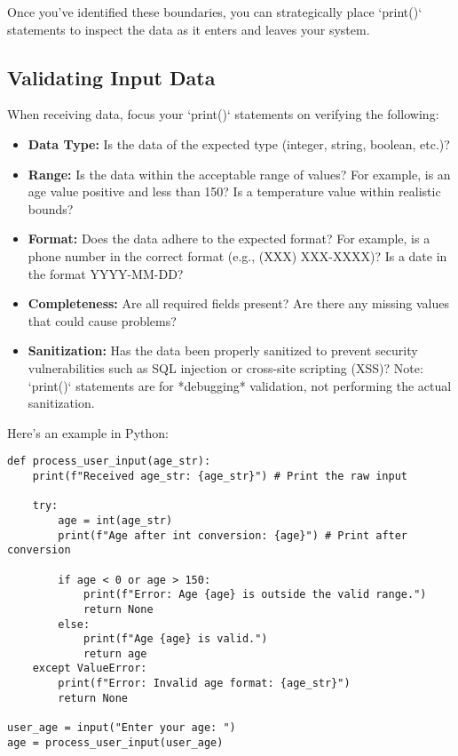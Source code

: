 \documentclass{article}
\begin{document}
{{{Once you've identified these boundaries, you can strategically place `print()` statements to inspect the data as it enters and leaves your system.

\subsection*{Validating Input Data}

When receiving data, focus your `print()` statements on verifying the following:

\begin{itemize}
    \itemsep0em
    \item \textbf{Data Type:} Is the data of the expected type (integer, string, boolean, etc.)?
    \item \textbf{Range:} Is the data within the acceptable range of values? For example, is an age value positive and less than 150? Is a temperature value within realistic bounds?
    \item \textbf{Format:} Does the data adhere to the expected format? For example, is a phone number in the correct format (e.g., (XXX) XXX-XXXX)? Is a date in the format YYYY-MM-DD?
    \item \textbf{Completeness:} Are all required fields present? Are there any missing values that could cause problems?
    \item \textbf{Sanitization:} Has the data been properly sanitized to prevent security vulnerabilities such as SQL injection or cross-site scripting (XSS)? Note: `print()` statements are for *debugging* validation, not performing the actual sanitization.
\end{itemize}

Here's an example in Python:

\begin{verbatim}
def process_user_input(age_str):
    print(f"Received age_str: {age_str}") # Print the raw input

    try:
        age = int(age_str)
        print(f"Age after int conversion: {age}") # Print after conversion

        if age < 0 or age > 150:
            print(f"Error: Age {age} is outside the valid range.")
            return None
        else:
            print(f"Age {age} is valid.")
            return age
    except ValueError:
        print(f"Error: Invalid age format: {age_str}")
        return None

user_age = input("Enter your age: ")
age = process_user_input(user_age)


\end{verbatim}}}}
\end{document}
